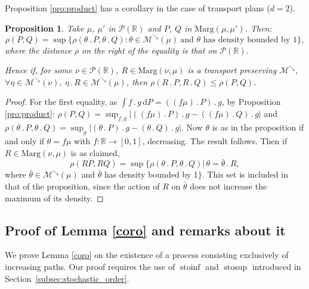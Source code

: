\documentclass[JEP,XML,SOM,Unicode,NoEqCountersInSection,NoFloatCountersInSection,published]{cedram}
\newcommand{\ldot}{\mathbin{.}}
\theoremstyle{plain}
\newtheorem{pro}[them]{Proposition}
\theoremstyle{definition}
\newcommand{\dd}{\mathrm{d}}
\newcommand{\p}{\mathcal{P}}
\newcommand{\ma}{\mathrm{Marg}}
\newcommand{\R}{\mathbb{R}}
\newcommand{\stosup}{\operatorname{stosup}}
\newcommand{\stoinf}{\operatorname{stoinf}}
\newcommand{\mdec}{\mathcal{M}^{\scriptscriptstyle\searrow}}
\begin{document}
Proposition \ref{pro:product} has a corollary in the case of transport plans ($d=2$).
\begin{pro}\label{pro:multiplicationcontractante}Take $\mu$, $\mu'$ in $\p(\R)$ and $P$, $Q$ in $\ma(\mu,\mu')$. Then:
\[\rho(P,Q)=\sup\{\rho(\theta\ldot P, \theta \ldot Q):\theta\in\mdec(\mu)\ \text{and $\theta$ has density bounded by $1$}\},\]
where the distance $\rho$ on the right of the equality is that on $\p(\R)$.

Hence if, for some $\nu\in \p(\R)$, $R\in\ma(\nu,\mu)$ is a transport preserving $\mdec$, \ie $\forall\eta\in\mdec(\nu)$, $\eta\ldot R\in\mdec(\mu)$, then $\rho(R\ldot P,R\ldot Q)\leqslant\rho(P,Q)$.
\end{pro}

\begin{proof}
For the first equality, as $\int f\ldot g\, \dd P=((f\mu)\ldot P)\ldot g$, by Proposition \ref{pro:product}: $\rho(P,Q)=\sup_{f,g} |((f\mu)\ldot P)\ldot g-((f\mu)\ldot Q)\ldot g|$ and $\rho(\theta\ldot P, \theta \ldot Q)=\sup_g |(\theta\ldot P)\ldot g-(\theta\ldot Q)\ldot g|$. Now $\theta$ is as in the proposition if and only if $\theta=f\mu$ with $f:\R\to[0,1]$, decreasing. The result follows. Then if $R\in\ma(\nu,\mu)$ is as claimed,
\[
\rho(RP,RQ)=\sup\{\rho(\theta\ldot P, \theta \ldot Q)|\,\theta=\bar\theta\ldot R,
\]
where $\bar\theta\in\mdec(\mu)$ and $\bar\theta$ has density bounded by 1$\}$. This set is included in that of the proposition, since the action of $R$ on $\bar\theta$ does not increase the maximum of its density.
\end{proof}

\subsection{Proof of Lemma \ref{coro} and remarks about it}\label{subsec:proof_coro}

We prove Lemma \ref{coro} on the existence of a process consisting exclusively of increasing paths. Our proof requires the use of $\stoinf$ and $\stosup$ introduced in Section~\ref{subsec:stochastic_order}.
\end{document}
